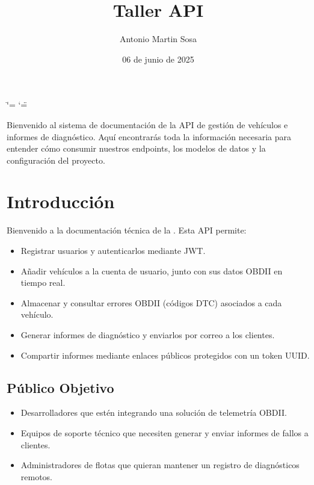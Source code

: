 \documentclass[a4paper,11pt,spanish]{sphinxmanual}
\title{Taller API}
\date{06 de junio de 2025}
\author{Antonio Martin Sosa}
\begin{document}
\ifdefined\shorthandoff
  \ifnum\catcode`\=\string=\active\shorthandoff{=}\fi
  \ifnum\catcode`\"=\active{}\fi
\fi

\pagestyle{empty}
\sphinxmaketitle
\pagestyle{plain}
\sphinxtableofcontents
\pagestyle{normal}
\label{\detokenize{index::doc}}


\sphinxAtStartPar
Bienvenido al sistema de documentación de la API de gestión de vehículos e informes de diagnóstico. Aquí encontrarás toda la información necesaria para entender cómo consumir nuestros endpoints, los modelos de datos y la configuración del proyecto.

\sphinxstepscope


\chapter{Introducción}
\label{\detokenize{introduccion:introduccion}}\label{\detokenize{introduccion::doc}}
\sphinxAtStartPar
Bienvenido a la documentación técnica de la . Esta API permite:
\begin{itemize}
\item {} 
\sphinxAtStartPar
Registrar usuarios y autenticarlos mediante JWT.

\item {} 
\sphinxAtStartPar
Añadir vehículos a la cuenta de usuario, junto con sus datos OBD\sphinxhyphen{}II en tiempo real.

\item {} 
\sphinxAtStartPar
Almacenar y consultar errores OBD\sphinxhyphen{}II (códigos DTC) asociados a cada vehículo.

\item {} 
\sphinxAtStartPar
Generar informes de diagnóstico y enviarlos por correo a los clientes.

\item {} 
\sphinxAtStartPar
Compartir informes mediante enlaces públicos protegidos con un token UUID.

\end{itemize}


\section{Público Objetivo}
\label{\detokenize{introduccion:publico-objetivo}}\begin{itemize}
\item {} 
\sphinxAtStartPar
Desarrolladores que estén integrando una solución de telemetría OBD\sphinxhyphen{}II.

\item {} 
\sphinxAtStartPar
Equipos de soporte técnico que necesiten generar y enviar informes de fallos a clientes.

\item {} 
\sphinxAtStartPar
Administradores de flotas que quieran mantener un registro de diagnósticos remotos.

\end{itemize}
\end{document}
